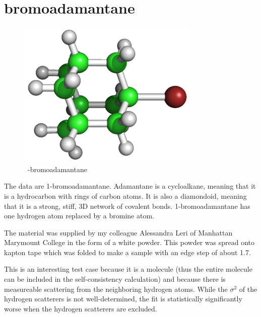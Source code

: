 \documentclass{article}
\let\stdsection\section
\renewcommand\section{\newpage\stdsection}
\begin{document}



\section{bromoadamantane}
\normalsize


\begin{figure}
  \includegraphics[width=\linewidth]{bromoadamantane/bromoadamantane.png}
  \caption{~\hfill{}-bromoadamantane}
\end{figure}

The data are 1-bromoadamantane.  Adamantane is a cycloalkane, meaning
that it is a hydrocarbon with rings of carbon atoms.  It is also a
diamondoid, meaning that it is a strong, stiff, 3D network of covalent
bonds.  1-bromoadamantane has one hydrogen atom replaced by a bromine
atom.

The material was supplied by my colleague Alessandra Leri of Manhattan
Marymount College in the form of a white powder.  This powder was
spread onto kapton tape which was folded to make a sample with an edge
step of about 1.7.

This is an interesting test case because it is a molecule (thus the
entire molecule can be included in the self-consistency calculation)
and because there is measureable scattering from the neighboring
hydrogen atoms.  While the $\sigma^2$ of the hydrogen scatterers is not
well-determined, the fit is statistically significantly worse when the
hydrogen scatterers are excluded.
\end{document}
